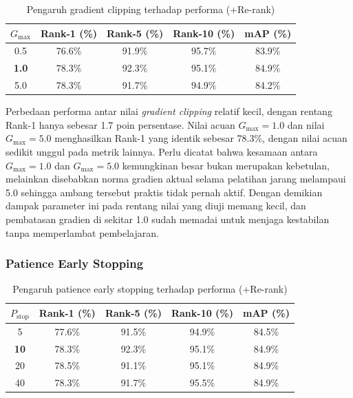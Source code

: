 \begin{table}[H]
    \centering
    \caption{Pengaruh gradient clipping terhadap performa (+Re-rank)}
    \label{tab:var_gradclip}
    \renewcommand{\arraystretch}{1.25}
    \begin{tabular}{ccccc}
        \hline
        $G_{\max}$     & \textbf{Rank-1 (\%)} & \textbf{Rank-5 (\%)} & \textbf{Rank-10 (\%)} & \textbf{mAP (\%)} \\
        \hline
        0{.}5         & 76.6\%               & 91.9\%               & 95.7\%                & 83.9\%             \\
        \textbf{1{.}0} & 78.3\%               & 92.3\%               & 95.1\%                & 84.9\%            \\
        5{.}0          & 78.3\%               & 91.7\%               & 94.9\%                & 84.2\%            \\
        \hline
    \end{tabular}
\end{table}

Perbedaan performa antar nilai \textit{gradient clipping} relatif kecil, dengan rentang Rank-1 hanya sebesar 1.7 poin persentase. Nilai acuan $G_{\max}=1{.}0$ dan nilai $G_{\max}=5{.}0$ menghasilkan Rank-1 yang identik sebesar 78.3\%, dengan nilai acuan sedikit unggul pada metrik lainnya. Perlu dicatat bahwa kesamaan antara $G_{\max}=1{.}0$ dan $G_{\max}=5{.}0$ kemungkinan besar bukan merupakan kebetulan, melainkan disebabkan norma gradien aktual selama pelatihan jarang melampaui 5.0 sehingga ambang tersebut praktis tidak pernah aktif. Dengan demikian dampak parameter ini pada rentang nilai yang diuji memang kecil, dan pembatasan gradien di sekitar 1.0 sudah memadai untuk menjaga kestabilan tanpa memperlambat pembelajaran.

\subsubsection{Patience Early Stopping}

\begin{table}[H]
    \centering
    \caption{Pengaruh patience early stopping terhadap performa (+Re-rank)}
    \label{tab:var_patience}
    \renewcommand{\arraystretch}{1.25}
    \begin{tabular}{ccccc}
        \hline
        $P_{\text{stop}}$ & \textbf{Rank-1 (\%)} & \textbf{Rank-5 (\%)} & \textbf{Rank-10 (\%)} & \textbf{mAP (\%)} \\
        \hline
        5                 & 77.6\%               & 91.5\%               & 94.9\%                & 84.5\%            \\
        \textbf{10}       & 78.3\%               & 92.3\%               & 95.1\%                & 84.9\%            \\
        20                & 78.5\%               & 91.1\%               & 95.1\%                & 84.9\%            \\
        40                & 78.3\%               & 91.7\%               & 95.5\%                & 84.9\%            \\
        \hline
    \end{tabular}
\end{table}

